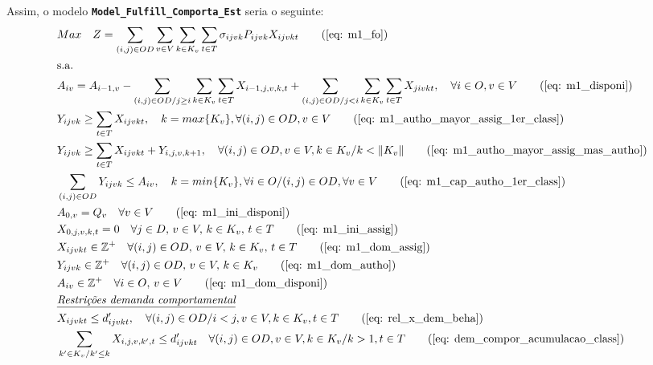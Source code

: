 Assim, o modelo \textbf{ \texttt{Model\_Fulfill\_Comporta\_Est}} seria o seguinte:
\allowdisplaybreaks
\begin{align}
	& Max \quad Z = \sum_{(i,j)\in OD} \sum_{v\in V} \sum_{k\in K_v} \sum_{t\in T} \sigma_{ijvk} P_{ijvk} X_{ijvkt}     \tag{\ref{eq: m1_fo}}   \\
	& \text{s.a.}  \notag \\
	& A_{iv} = A_{i-1,v} - \sum_{(i,j) \in OD/j \geq i} \sum_{k\in K_v}\sum_{t\in T}X_{i-1,j,v,k,t} + \sum_{(i,j) \in OD/j<i} \sum_{k\in K_v}\sum_{t\in T}X_{jivkt}, \quad \forall i \in O, v \in V   \tag{\ref{eq: m1_disponi}} \\
	& Y_{ijvk} \geq  \sum_{t \in T} X_{ijvkt},  \quad k = max\{K_v\}, \forall(i,j) \in OD ,v \in V     \tag{\ref{eq: m1_autho_mayor_assig_1er_class}} \\
	& Y_{ijvk} \geq  \sum_{t \in T} X_{ijvkt} + Y_{i,j,v,k + 1} , \quad \forall(i,j) \in OD, v \in V, k \in K_v / k < \lVert K_v \rVert   \tag{\ref{eq: m1_autho_mayor_assig_mas_autho}} \\
	& \sum_{(i,j) \in OD} Y_{ijvk} \leq A_{iv}, \quad  k = min\{K_v\}, \forall i \in O / (i,j) \in OD,   \forall v \in V       \tag{\ref{eq: m1_cap_autho_1er_class}} \\
	& A_{0,v} = Q_v \quad \forall v \in V  \tag{\ref{eq: m1_ini_disponi}} \\ 
	& X_{0,j,v,k,t} = 0 \quad \forall j \in D,\, v \in V,\, k \in K_v,\, t \in T  \tag{\ref{eq: m1_ini_assig}} \\ 
	& X_{ijvkt} \in \mathbb{Z}^+ \quad \forall(i,j) \in OD,\, v \in V,\, k \in K_v,\, t \in T  \tag{\ref{eq: m1_dom_assig}} \\ 
	& Y_{ijvk} \in \mathbb{Z}^+ \quad \forall(i,j) \in OD,\, v \in V,\, k \in K_v  \tag{\ref{eq: m1_dom_autho}} \\ 
	& A_{iv} \in \mathbb{Z}^+ \quad \forall i \in O,\, v \in V  \tag{\ref{eq: m1_dom_disponi}} \\
	& \textit{\underline{Restrições demanda comportamental}}         \notag   \\
	& X_{ijvkt} \leq d'_{ijvkt},  \quad \forall (i,j) \in OD / i < j  ,v \in V, k \in K_v, t\in T   \tag{\ref{eq: rel_x_dem_beha}} \\
	& \sum_{k' \in K_v / k' \leq k}X_{i,j,v,k',t} \leq d'_{ijvkt} \quad \forall (i,j) \in OD, v \in V, k \in K_v / k > 1, t\in T     \tag{\ref{eq: dem_compor_acumulacao_class}} \\

\end{align}
